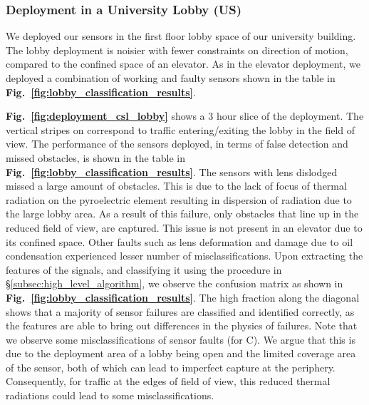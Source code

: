 \subsubsection{Deployment in a University Lobby (US)}\label{subsubsec:lobby} We deployed our sensors %
in the first floor lobby space of our university building. 
The lobby deployment is noisier with fewer constraints on direction of motion, compared to the confined space of an elevator.
As in the elevator deployment, we deployed a combination of working and faulty sensors shown in the table in {\bfseries Fig.~\ref{fig:lobby_classification_results}}. 



\textbf{Fig.~\ref{fig:deployment_csl_lobby}} shows a 3 hour slice of the deployment. %
The vertical stripes on \cout correspond to traffic entering/exiting the lobby in the field of view. 
The performance of the sensors deployed, in terms of false detection and missed obstacles, is shown in the table in {\bfseries Fig.~\ref{fig:lobby_classification_results}}. The sensors with lens dislodged missed a large amount of obstacles. This is due to the lack of focus of thermal radiation on the pyroelectric element resulting in dispersion of radiation due to the large lobby area. As a result of this failure, only obstacles that line up in the reduced field of view, are captured. This issue is not present in an elevator due to its confined space.
Other faults such as lens deformation and damage due to oil condensation experienced lesser number of misclassifications. 
Upon extracting the features of the \aout signals, and classifying it using the procedure in \S\ref{subsec:high_level_algorithm}, %
we observe the confusion matrix as shown in {\bfseries Fig.~\ref{fig:lobby_classification_results}}. The high fraction along the diagonal shows that a majority of sensor failures are classified and identified correctly, as the features are able to bring out differences in the physics of failures.
Note that we observe some misclassifications of sensor faults (\eg for C). We argue that this is due to the deployment area of a lobby being open and the limited coverage area of the sensor, both of which can lead to imperfect capture at the periphery. Consequently, for traffic at the edges of field of view, this reduced thermal radiations could lead to some misclassifications. %





